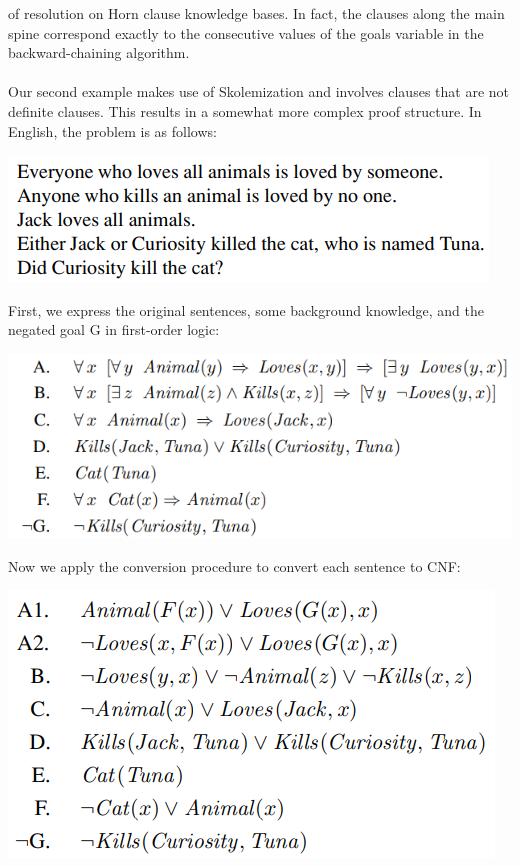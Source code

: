 of resolution on Horn clause knowledge bases. In fact, the clauses along the main spine correspond exactly to the consecutive values of the goals variable in the backward-chaining algorithm.\\\\
Our second example makes use of Skolemization and involves clauses that are not definite clauses. This results in a somewhat more complex proof structure. In English, the problem is as follows:
\begin{center}
    \includegraphics[]{images/resolution-fol-proof.png}
\end{center}
First, we express the original sentences, some background knowledge, and the negated goal G in first-order logic:
\begin{center}
    \includegraphics[]{images/kb-res-proof.png}
\end{center}
Now we apply the conversion procedure to convert each sentence to CNF:
\begin{center}
    \includegraphics[]{images/kb-cnf-re-prrof.png}
\end{center}
